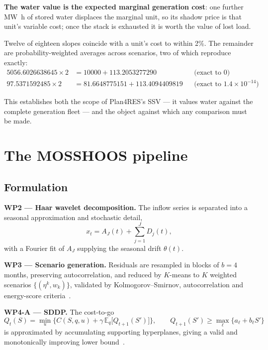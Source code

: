 \documentclass[12pt,a4paper]{article}
\newcommand{\E}{\mathbb{E}}
\begin{document}
\textbf{The water value is the expected marginal generation cost}: one further
\si{\mega\watt\hour} of stored water displaces the marginal unit, so its shadow
price is that unit's variable cost; once the stack is exhausted it is worth the
value of lost load.

Twelve of eighteen slopes coincide with a unit's cost to within 2\%. The
remainder are probability-weighted averages across scenarios, two of which
reproduce exactly:
\begin{align}
5056.6026638645 \times 2 &= 10000 + 113.2053277290 && \text{(exact to } 0\text{)}\\
97.5371592485 \times 2 &= 81.6648775151 + 113.4094409819 && \text{(exact to } 1.4\times10^{-14})
\end{align}

This establishes both the scope of Plan4RES's SSV --- it values water against
the complete generation fleet --- and the object against which any comparison
must be made.

\section{The MOSSHOOS pipeline}

\subsection{Formulation}

\textbf{WP2 --- Haar wavelet decomposition.} The inflow series is separated into
a seasonal approximation and stochastic detail,
\begin{equation}
x_t = A_J(t) + \sum_{j=1}^{J} D_j(t),
\end{equation}
with a Fourier fit of $A_J$ supplying the seasonal drift $\theta(t)$.

\textbf{WP3 --- Scenario generation.} Residuals are resampled in blocks of
$b=4$ months, preserving autocorrelation, and reduced by $K$-means to $K$
weighted scenarios $\{(\eta^k, w_k)\}$, validated by Kolmogorov--Smirnov,
autocorrelation and energy-score criteria~\citep{GneitingRaftery2007}.

\textbf{WP4-A --- SDDP.} The cost-to-go
\begin{equation}
Q_t(S) = \min_{u} \Big\{ C(S,q,u) + \gamma\,\E_q\big[Q_{t+1}(S')\big] \Big\},
\qquad
Q_{t+1}(S') \geq \max_\ell \{a_\ell + b_\ell S'\}
\end{equation}
is approximated by accumulating supporting hyperplanes, giving a valid and
monotonically improving lower bound~\citep{PereiraPinto1991,Shapiro2009}.
\end{document}
